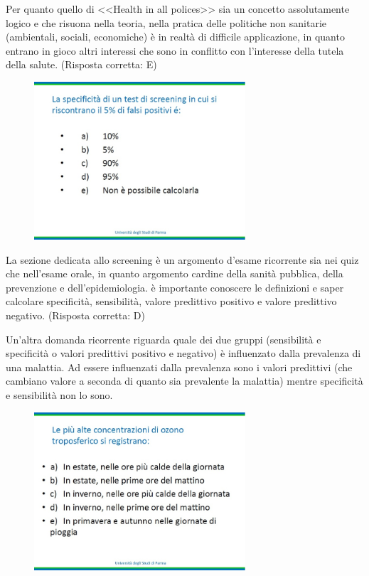 Per quanto quello di \textless{}\textless{}Health in all
polices\textgreater{}\textgreater{} sia un concetto assolutamente logico
e che risuona nella teoria, nella pratica delle politiche non sanitarie
(ambientali, sociali, economiche) è in realtà di difficile applicazione,
in quanto entrano in gioco altri interessi che sono in conflitto con
l'interesse della tutela della salute. (Risposta corretta: E)

\begin{figure}[!ht]
\centering
	\includegraphics[width=0.7\textwidth]{25/image4.jpeg}
	\end{figure}

La sezione dedicata allo screening è un argomento d'esame ricorrente sia
nei quiz che nell'esame orale, in quanto argomento cardine della sanità
pubblica, della prevenzione e dell'epidemiologia. è importante conoscere
le definizioni e saper calcolare specificità, sensibilità, valore
predittivo positivo e valore predittivo negativo. (Risposta corretta: D)

Un'altra domanda ricorrente riguarda quale dei due gruppi (sensibilità e
specificità o valori predittivi positivo e negativo) è influenzato dalla
prevalenza di una malattia. Ad essere influenzati dalla prevalenza sono
i valori predittivi (che cambiano valore a seconda di quanto sia
prevalente la malattia) mentre specificità e sensibilità non lo sono.

\begin{figure}[!ht]
\centering
	\includegraphics[width=0.7\textwidth]{25/image5.jpeg}
	\end{figure}

